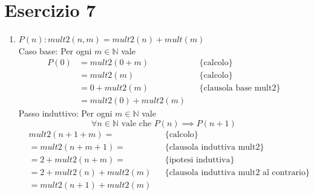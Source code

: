 \documentclass{article}
\begin{document}
\section{Esercizio 7}
\begin{enumerate}
    \item \(P(n): mult2(n,m) = mult2(n) + mult(m)\)\\
          Caso base: Per ogni \(m \in \mathbb{N}\) vale
          \begin{align*}
              P(0) & = mult2(0 + m)        &  & \{\text{calcolo}\}             \\
                   & = mult2(m)            &  & \{\text{calcolo}\}             \\
                   & = 0 + mult2(m)        &  & \{\text{clausola base mult2}\} \\
                   & = mult2(0) + mult2(m)
          \end{align*}
          Passo induttivo: Per ogni \(m \in \mathbb{N}\) vale
          \[\forall n \in \mathbb{N} \text{ vale che } P(n) \implies P(n+1)\]
          \begin{align*}
               & mult2(n + 1 + m) =        &  & \{\text{calcolo}\}                               \\
               & = mult2(n + m + 1) =      &  & \{\text{clausola induttiva mult2}\}              \\
               & = 2 + mult2(n + m) =      &  & \{\text{ipotesi induttiva}\}                     \\
               & = 2 + mult2(n) + mult2(m) &  & \{\text{clausola induttiva mult2 al contrario}\} \\
               & = mult2(n + 1) + mult2(m)
          \end{align*}


\end{enumerate}
\end{document}
